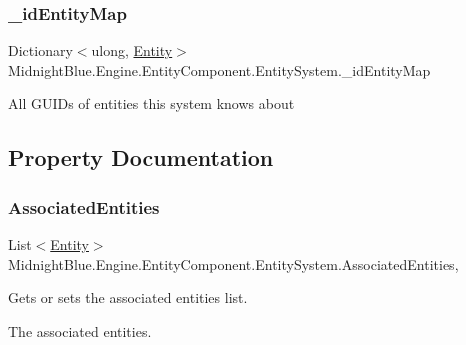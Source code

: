 \subsubsection{\texorpdfstring{\+\_\+id\+Entity\+Map}{\_idEntityMap}}
{\footnotesize\ttfamily Dictionary$<$ulong, \hyperlink{class_midnight_blue_1_1_engine_1_1_entity_component_1_1_entity}{Entity}$>$ Midnight\+Blue.\+Engine.\+Entity\+Component.\+Entity\+System.\+\_\+id\+Entity\+Map\hspace{0.3cm}{\ttfamily [protected]}}



All G\+U\+ID\textquotesingle{}s of entities this system knows about 



\subsection{Property Documentation}
\hypertarget{class_midnight_blue_1_1_engine_1_1_entity_component_1_1_entity_system_a8c0d1a5e524e46e7c0be016ccbb3ccee}{}\label{class_midnight_blue_1_1_engine_1_1_entity_component_1_1_entity_system_a8c0d1a5e524e46e7c0be016ccbb3ccee} 
\subsubsection{\texorpdfstring{Associated\+Entities}{AssociatedEntities}}
{\footnotesize\ttfamily List$<$\hyperlink{class_midnight_blue_1_1_engine_1_1_entity_component_1_1_entity}{Entity}$>$ Midnight\+Blue.\+Engine.\+Entity\+Component.\+Entity\+System.\+Associated\+Entities\hspace{0.3cm}{\ttfamily [get]}, {\ttfamily [set]}}



Gets or sets the associated entities list. 

The associated entities.\hypertarget{class_midnight_blue_1_1_engine_1_1_entity_component_1_1_entity_system_a6b8663934bf577c3109242f1c4389c40}{}\label{class_midnight_blue_1_1_engine_1_1_entity_component_1_1_entity_system_a6b8663934bf577c3109242f1c4389c40} 
